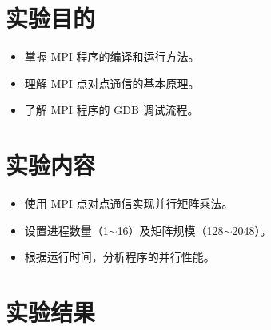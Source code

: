 \documentclass{SYSUReport}
\date{2025年4月7日}
\begin{document}
\cover
\thispagestyle{empty}
\clearpage

\section{实验目的}
\begin{itemize}
   \item 掌握 MPI 程序的编译和运行方法。
    \item 理解 MPI 点对点通信的基本原理。
    \item 了解 MPI 程序的 GDB 调试流程。
\end{itemize}

\section{实验内容}
\begin{itemize}
   \item 使用 MPI 点对点通信实现并行矩阵乘法。
    \item 设置进程数量（1$\sim$16）及矩阵规模（128$\sim$2048）。
    \item 根据运行时间，分析程序的并行性能。
\end{itemize}


\section{实验结果}
\end{document}
